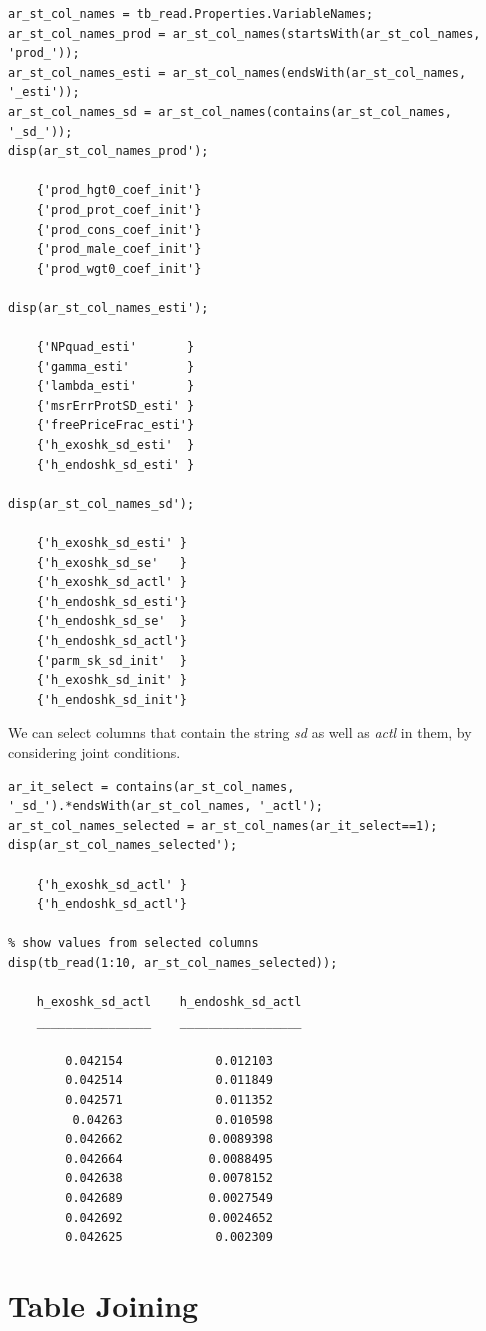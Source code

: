\documentclass[
]{book}
\begin{document}
\begin{verbatim}
ar_st_col_names = tb_read.Properties.VariableNames;
ar_st_col_names_prod = ar_st_col_names(startsWith(ar_st_col_names, 'prod_'));
ar_st_col_names_esti = ar_st_col_names(endsWith(ar_st_col_names, '_esti'));
ar_st_col_names_sd = ar_st_col_names(contains(ar_st_col_names, '_sd_'));
disp(ar_st_col_names_prod');

    {'prod_hgt0_coef_init'}
    {'prod_prot_coef_init'}
    {'prod_cons_coef_init'}
    {'prod_male_coef_init'}
    {'prod_wgt0_coef_init'}

disp(ar_st_col_names_esti');

    {'NPquad_esti'       }
    {'gamma_esti'        }
    {'lambda_esti'       }
    {'msrErrProtSD_esti' }
    {'freePriceFrac_esti'}
    {'h_exoshk_sd_esti'  }
    {'h_endoshk_sd_esti' }

disp(ar_st_col_names_sd');

    {'h_exoshk_sd_esti' }
    {'h_exoshk_sd_se'   }
    {'h_exoshk_sd_actl' }
    {'h_endoshk_sd_esti'}
    {'h_endoshk_sd_se'  }
    {'h_endoshk_sd_actl'}
    {'parm_sk_sd_init'  }
    {'h_exoshk_sd_init' }
    {'h_endoshk_sd_init'}
\end{verbatim}

We can select columns that contain the string \emph{sd} as well as \emph{actl} in
them, by considering joint conditions.

\begin{verbatim}
ar_it_select = contains(ar_st_col_names, '_sd_').*endsWith(ar_st_col_names, '_actl');
ar_st_col_names_selected = ar_st_col_names(ar_it_select==1);
disp(ar_st_col_names_selected');

    {'h_exoshk_sd_actl' }
    {'h_endoshk_sd_actl'}

% show values from selected columns
disp(tb_read(1:10, ar_st_col_names_selected));

    h_exoshk_sd_actl    h_endoshk_sd_actl
    ________________    _________________

        0.042154             0.012103    
        0.042514             0.011849    
        0.042571             0.011352    
         0.04263             0.010598    
        0.042662            0.0089398    
        0.042664            0.0088495    
        0.042638            0.0078152    
        0.042689            0.0027549    
        0.042692            0.0024652    
        0.042625             0.002309    
\end{verbatim}

\hypertarget{table-joining}{%
\section{Table Joining}\label{table-joining}}
\end{document}
